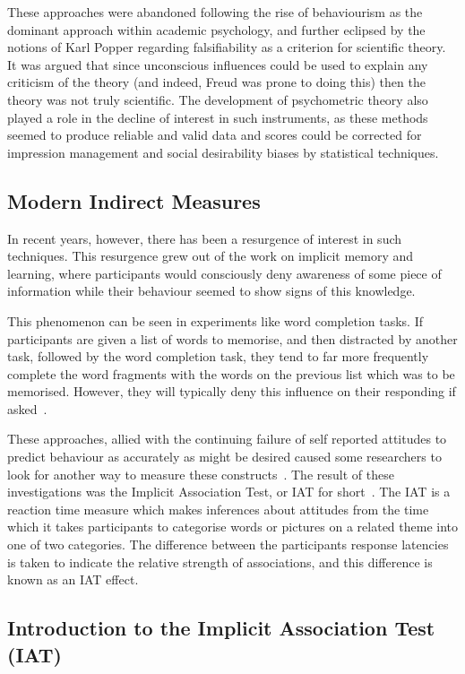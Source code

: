 These approaches were abandoned following the rise of behaviourism as the dominant approach within academic psychology, and further eclipsed by the notions of Karl Popper regarding falsifiability as a criterion for scientific theory. It was argued that since unconscious influences could be used to explain any criticism of the theory (and indeed, Freud was prone to doing this) then the theory was not truly scientific. The development of psychometric theory also played a role in the decline of interest in such instruments, as these methods seemed to produce reliable and valid data and scores could be corrected for impression management and social desirability biases by statistical techniques. 

\subsection{Modern Indirect Measures}
\label{sec:turn-back-indirect}
In recent years, however, there has been a resurgence of interest in such techniques. This resurgence grew out of the work on implicit memory and learning, where participants would consciously deny awareness of some piece of information while their behaviour seemed to show signs of this knowledge.  

This phenomenon can be seen in  experiments like word completion tasks. If participants are given a list of words to memorise, and then distracted by another task, followed by the word completion task, they tend to far more frequently complete the word fragments with the words on the previous list which was to be memorised.  However, they will typically deny this influence on their responding if asked~\cite{Wittenbrink2007a}. 

These approaches, allied with the continuing failure of self reported attitudes to predict behaviour as accurately as might be desired caused some researchers to look for another way to measure these constructs~\cite{Greenwald1995a}. The result of these investigations was the Implicit Association Test, or IAT for short~\cite{Greenwald1998}. The IAT is a reaction time measure which makes inferences about attitudes from the time which it takes participants to categorise words or pictures on a related theme into one of two categories. The difference between the participants response latencies is taken to indicate the relative strength of associations, and this difference is known as an IAT effect.  


\subsection{Introduction to the Implicit Association Test (IAT)}
\label{sec:intr-impl-assoc}

